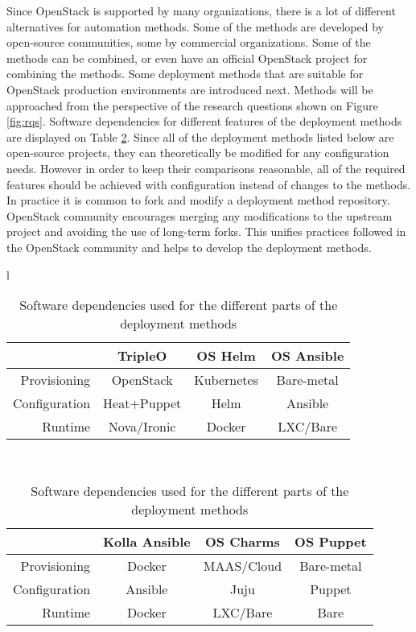 Since OpenStack is supported by many organizations, there is a lot of different
alternatives for automation methods. Some of the methods are developed by
open-source communities, some by commercial organizations. Some of the methods
can be combined, or even have an official OpenStack project for combining the
methods. Some deployment methods that are suitable for OpenStack production
environments are introduced next. Methods will be approached from the
perspective of the research questions shown on Figure \ref{fig:rqs}. Software
dependencies for different features of the deployment methods are displayed on
Table \ref{tab:dependencies}. Since all of the deployment methods listed below
are open-source projects, they can theoretically be modified for any
configuration needs. However in order to keep their comparisons reasonable, all
of the required features should be achieved with configuration instead of
changes to the methods. In practice it is common to fork and modify a
deployment method repository. OpenStack community encourages merging any
modifications to the upstream project and avoiding the use of long-term forks.
This unifies practices followed in the OpenStack community and helps to
develop the deployment methods.

\begin{table}[t]
\centering
\begin{tabular}{ l }
\begin{tabular} {r | c c c } \\
              & TripleO     & OS Helm     & OS Ansible  \\
\hline
Provisioning  & OpenStack   & Kubernetes  & Bare-metal  \\
Configuration & Heat+Puppet & Helm        & Ansible     \\
Runtime       & Nova/Ironic & Docker      & LXC/Bare    \\
\end{tabular} \\
\begin{tabular} {r | c c c } \\
              & Kolla Ansible & OS Charms   & OS Puppet \\
\hline
Provisioning  & Docker        & MAAS/Cloud  & Bare-metal\\
Configuration & Ansible       & Juju        & Puppet    \\
Runtime       & Docker        & LXC/Bare    & Bare      \\
\end{tabular}
\end{tabular}
\caption{Software dependencies used for the different parts of the deployment
         methods}
\label{tab:dependencies}
\end{table}


